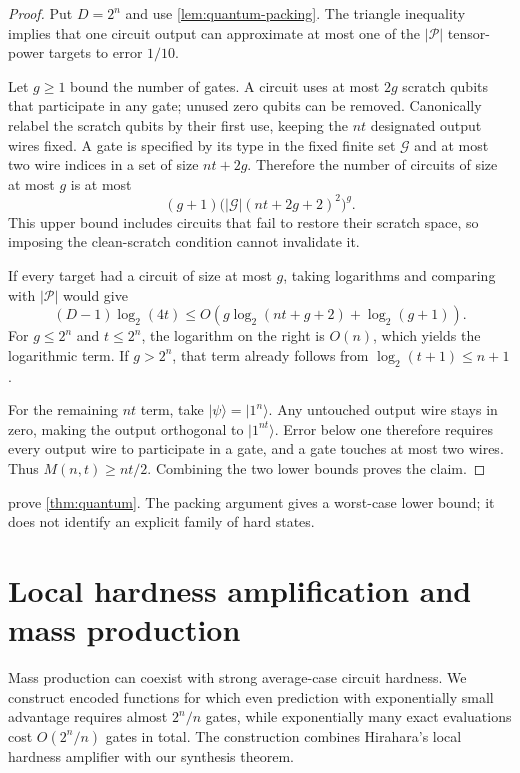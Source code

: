 \documentclass[11pt]{article}
\begin{document}
\begin{proof}
Put $D=2^n$ and use \cref{lem:quantum-packing}.  The triangle
inequality implies that one circuit output can approximate at most
one of the $|\mathcal P|$ tensor-power targets to error $1/10$.

Let $g\ge1$ bound the number of gates.  A circuit uses at most $2g$
scratch qubits that participate in any gate; unused zero qubits can
be removed.  Canonically relabel the scratch qubits by their first use,
keeping the $nt$ designated output wires fixed.  A gate is specified
by its type in the fixed finite set $\mathcal G$ and at most two wire
indices in a set of size $nt+2g$.  Therefore the number of circuits
of size at most $g$ is at most
\[
 (g+1)\bigl(|\mathcal G|(nt+2g+2)^2\bigr)^g.
\]
This upper bound includes circuits that fail to restore their scratch
space, so imposing the clean-scratch condition cannot invalidate it.

If every target had a circuit of size at most $g$, taking logarithms
and comparing with $|\mathcal P|$ would give
\[
 (D-1)\log_2(4t)
    \le O\!\left(g\log_2(nt+g+2)+\log_2(g+1)\right).
\]
For $g\le2^n$ and $t\le2^n$, the logarithm on the right is $O(n)$,
which yields the logarithmic term.  If $g>2^n$, that term already follows
from $\log_2(t+1)\le n+1$.

For the remaining $nt$ term, take $|\psi\rangle=|1^n\rangle$.
Any untouched output wire stays in zero, making the output orthogonal
to $|1^{nt}\rangle$.  Error below one therefore requires every output
wire to participate in a gate, and a gate touches at most two wires.
Thus $M(n,t)\ge nt/2$.  Combining the two lower bounds proves the claim.
\end{proof}

 prove
\cref{thm:quantum}.  The packing argument gives a worst-case lower bound;
it does not identify an explicit family of hard states.


\section{Local hardness amplification and mass production}\label{sec:amplification}

Mass production can coexist with strong average-case circuit hardness.
We construct encoded functions for which even prediction with exponentially
small advantage requires almost $2^n/n$ gates, while exponentially many
exact evaluations cost $O(2^n/n)$ gates in total.  The construction combines
Hirahara's local hardness amplifier with our synthesis theorem.
\end{document}
